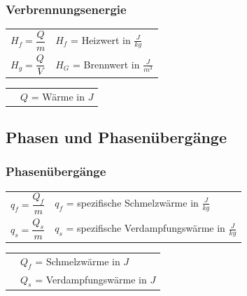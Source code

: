 		\newline
		\newline
		\newline
		\begin{minipage}[t]{18cm}
			\subsubsection{Verbrennungsenergie}
				\renewcommand{\arraystretch}{2.5}
				\begin{tabular}{ p{4cm} | p{7cm}}
					$H_f = \dfrac{Q}{m}$	&	$H_f$ = Heizwert in $\frac{J}{kg}$\\
					$H_g = \dfrac{Q}{V}$	&	$H_G$ = Brennwert in $\frac{J}{m^3}$\\
				\end{tabular}
				\renewcommand{\arraystretch}{1.5}
				\newline
				\begin{tabular}{ p{4cm} | p{7cm} }
					& $Q$ = Wärme in $J$\\
				\end{tabular} 
				\renewcommand{\arraystretch}{1}
		\end{minipage}
	
	\newpage
	\subsection{Phasen und Phasenübergänge}
		\begin{minipage}[t]{13cm}
			\subsubsection{Phasenübergänge}
			\renewcommand{\arraystretch}{2.5}
			\begin{tabular}{ p{4cm} | p{7cm}}
				$q_f = \dfrac{Q_f}{m}$	&	$q_f$ = spezifische Schmelzwärme in $\frac{J}{kg}$\\
				$q_s = \dfrac{Q_s}{m}$	&	$q_s$ = spezifische Verdampfungswärme in $\frac{J}{kg}$\\
			\end{tabular}
			\renewcommand{\arraystretch}{1.5}
			\begin{tabular}{ p{4cm} | p{7cm} }
				& $Q_f$ = Schmelzwärme in $J$\\
				& $Q_s$ = Verdampfungswärme in $J$\\
			\end{tabular} 
			\renewcommand{\arraystretch}{1}
		\end{minipage}
		\newline
		\newline
